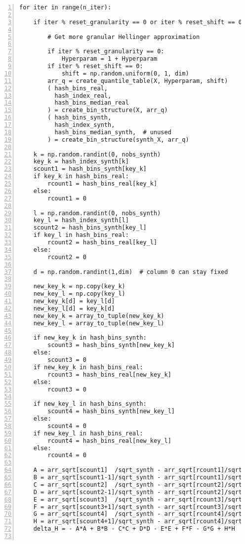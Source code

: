 \documentclass[oneside,10pt]{book}
\begin{document}
\begin{lstlisting}[numbers=left]
for iter in range(n_iter):

    if iter % reset_granularity == 0 or iter % reset_shift == 0 or iter == 0:   

        # Get more granular Hellinger approximation

        if iter % reset_granularity == 0: 
            Hyperparam = 1 + Hyperparam    
        if iter % reset_shift == 0: 
            shift = np.random.uniform(0, 1, dim) 
        arr_q = create_quantile_table(X, Hyperparam, shift) 
        ( hash_bins_real, 
          hash_index_real, 
          hash_bins_median_real 
        ) = create_bin_structure(X, arr_q)
        ( hash_bins_synth, 
          hash_index_synth,
          hash_bins_median_synth,  # unused
        ) = create_bin_structure(synth_X, arr_q)

    k = np.random.randint(0, nobs_synth) 
    key_k = hash_index_synth[k]
    scount1 = hash_bins_synth[key_k]
    if key_k in hash_bins_real:
        rcount1 = hash_bins_real[key_k]
    else:
        rcount1 = 0

    l = np.random.randint(0, nobs_synth)  
    key_l = hash_index_synth[l]
    scount2 = hash_bins_synth[key_l]
    if key_l in hash_bins_real:
        rcount2 = hash_bins_real[key_l]
    else:
        rcount2 = 0

    d = np.random.randint(1,dim)  # column 0 can stay fixed

    new_key_k = np.copy(key_k)
    new_key_l = np.copy(key_l)
    new_key_k[d] = key_l[d]
    new_key_l[d] = key_k[d]
    new_key_k = array_to_tuple(new_key_k)
    new_key_l = array_to_tuple(new_key_l)

    if new_key_k in hash_bins_synth:
        scount3 = hash_bins_synth[new_key_k]
    else:
        scount3 = 0
    if new_key_k in hash_bins_real:
        rcount3 = hash_bins_real[new_key_k]
    else:
        rcount3 = 0

    if new_key_l in hash_bins_synth:
        scount4 = hash_bins_synth[new_key_l]
    else:
        scount4 = 0
    if new_key_l in hash_bins_real:
        rcount4 = hash_bins_real[new_key_l]
    else:
        rcount4 = 0

    A = arr_sqrt[scount1]  /sqrt_synth - arr_sqrt[rcount1]/sqrt_real
    B = arr_sqrt[scount1-1]/sqrt_synth - arr_sqrt[rcount1]/sqrt_real
    C = arr_sqrt[scount2]  /sqrt_synth - arr_sqrt[rcount2]/sqrt_real
    D = arr_sqrt[scount2-1]/sqrt_synth - arr_sqrt[rcount2]/sqrt_real
    E = arr_sqrt[scount3]  /sqrt_synth - arr_sqrt[rcount3]/sqrt_real
    F = arr_sqrt[scount3+1]/sqrt_synth - arr_sqrt[rcount3]/sqrt_real
    G = arr_sqrt[scount4]  /sqrt_synth - arr_sqrt[rcount4]/sqrt_real
    H = arr_sqrt[scount4+1]/sqrt_synth - arr_sqrt[rcount4]/sqrt_real
    delta_H = - A*A + B*B - C*C + D*D - E*E + F*F - G*G + H*H


\end{lstlisting}
\end{document}
